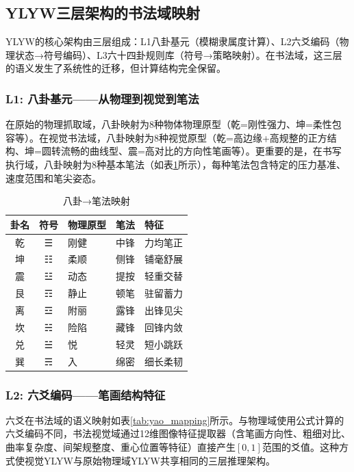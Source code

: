 \documentclass[12pt,a4paper]{article}
\begin{document}
\subsection{YLYW三层架构的书法域映射}

YLYW的核心架构由三层组成：L1八卦基元（模糊隶属度计算）、L2六爻编码（物理状态→符号编码）、L3六十四卦规则库（符号→策略映射）。在书法域，这三层的语义发生了系统性的迁移，但计算结构完全保留。

\subsubsection{L1: 八卦基元——从物理到视觉到笔法}

在原始的物理抓取域，八卦映射为8种物体物理原型（乾=刚性强力、坤=柔性包容等）。在视觉书法域，八卦映射为8种视觉原型（乾=高边缘+高规整的正方结构、坤=圆转流畅的曲线型、震=高对比的方向性笔画等）。更重要的是，在书写执行域，八卦映射为8种基本笔法（如表\ref{tab:trigram_brush}所示），每种笔法包含特定的压力基准、速度范围和笔尖姿态。

\begin{table}[htbp]
\centering
\caption{八卦→笔法映射}
\label{tab:trigram_brush}
\begin{tabular}{cclll}
\toprule
卦名 & 符号 & 物理原型 & 笔法 & 特征 \\
\midrule
乾 & ☰ & 刚健 & 中锋 & 力均笔正 \\
坤 & ☷ & 柔顺 & 侧锋 & 铺毫舒展 \\
震 & ☳ & 动态 & 提按 & 轻重交替 \\
艮 & ☶ & 静止 & 顿笔 & 驻留蓄力 \\
离 & ☲ & 附丽 & 露锋 & 出锋见尖 \\
坎 & ☵ & 险陷 & 藏锋 & 回锋内敛 \\
兑 & ☱ & 悦 & 轻灵 & 短小跳跃 \\
巽 & ☴ & 入 & 绵密 & 细长柔韧 \\
\bottomrule
\end{tabular}
\end{table}

\subsubsection{L2: 六爻编码——笔画结构特征}

六爻在书法域的语义映射如表\ref{tab:yao_mapping}所示。与物理域使用公式计算的六爻编码不同，书法视觉域通过12维图像特征提取器（含笔画方向性、粗细对比、曲率复杂度、间架规整度、重心位置等特征）直接产生$[0,1]$范围的爻值。这种方式使视觉YLYW与原始物理域YLYW共享相同的三层推理架构。
\end{document}
